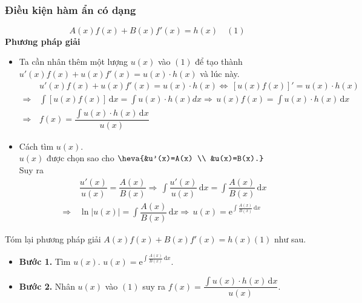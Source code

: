 \begin{dang}{~}
	\subsubsection{Điều kiện hàm ẩn có dạng} $$A(x)f(x)+B(x)f'(x)=h(x)\quad (1)$$
	\textbf{Phương pháp giải}
	\begin{itemize}
		\item Ta cần nhân thêm một lượng $u(x)$ vào  $(1)$ để tạo thành \break $u'(x) f(x)+u(x) f'(x)=u(x) \cdot h(x)$ và lúc này.
		      \begin{align*}
			                      & \, u'(x) f(x)+u(x) f'(x)=u(x) \cdot h(x)                                                        
			      \Leftrightarrow \,\left[u(x) f(x)\right]'=u(x) \cdot h(x)                                                       \\
			      \Rightarrow     & \, \int\left[u(x) f(x)\right] \mathrm{\,d} x=\int u(x) \cdot h(x) d x 
			      \Rightarrow   \, u(x) f(x)=\int u(x) \cdot h(x) \mathrm{\,d} x                                   \\
			      \Rightarrow     & \, f(x)=\dfrac{\int u(x) \cdot h(x) \mathrm{\,d} x}{u(x)}
		      \end{align*}
		\item Cách tìm $u(x)$.\\
		      $u(x)$ được chọn sao cho  $\heva{&u'(x)=A(x) \\ &u(x)=B(x).}$\\
		      Suy ra
		      \begin{align*}
			                  & \,\dfrac{u'(x)}{u(x)}=\dfrac{A(x)}{B(x)}                                                                    
			      \Rightarrow \, \int \dfrac{u'(x)}{u(x)} \mathrm{\,d} x=\int \dfrac{A(x)}{B(x)} \mathrm{\,d} x \\
			      \Rightarrow & \, \ln |u(x)|=\int \dfrac{A(x)}{B(x)} \mathrm{\,d} x                                           
			      \Rightarrow \, u(x)=\mathrm{e}^{\int\tfrac{A(x)}{B(x)} \mathrm{\,d} x}
		      \end{align*}
	\end{itemize}
	Tóm lại phương pháp giải $A(x)f(x)+B(x)f'(x)=h(x)$\quad $(1)$ như sau.
	\begin{itemize}
		\item \textbf{Bước 1.} Tìm $u(x)$. $u(x)=\mathrm{e}^{\int\tfrac{A(x)}{B(x)} \mathrm{\,d} x}$.
		\item \textbf{Bước 2.} Nhân $u(x)$ vào $(1)$ suy ra $f(x)=\dfrac{\int\limits u(x) \cdot h(x) \mathrm{\,d}x}{u(x)}$.
	\end{itemize}

\end{dang}
